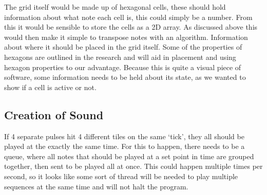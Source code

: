 \documentclass[10pt,a4paper]{article}
\begin{document}
\noindent
The grid itself would be made up of hexagonal cells, these should hold information about what note each cell is, this could simply be a number. From this it would be sensible to store the cells as a 2D array. As discussed above this would then make it simple to transpose notes with an algorithm. Information about where it should be placed in the grid itself. Some of the properties of hexagons are outlined in the research and will aid in placement and using hexagon properties to our advantage. Because this is quite a visual piece of software, some information needs to be held about its state, as we wanted to show if a cell is active or not.

\subsection{Creation of Sound}
If 4 separate pulses hit 4 different tiles on the same ‘tick’, they all should be played at the exactly the same time. For this to happen, there needs to be a queue, where all notes that should be played at a set point in time are grouped together, then sent to be played all at once. This could happen multiple times per second, so it looks like some sort of thread will be needed to play multiple sequences at the same time and will not halt the program.
\end{document}
